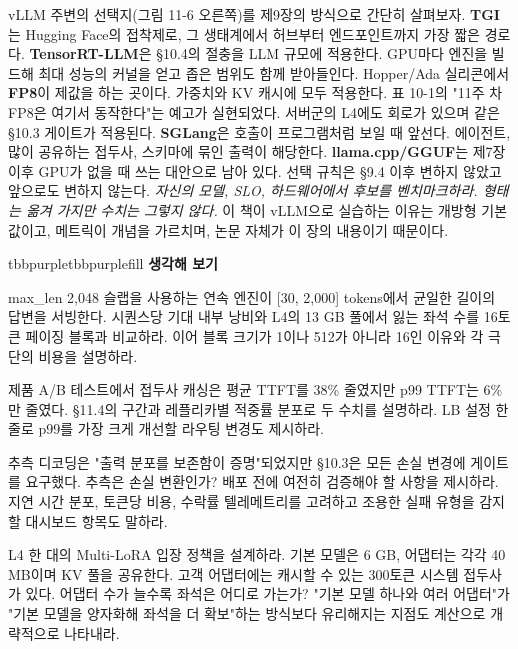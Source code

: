 vLLM 주변의 선택지(그림 11-6 오른쪽)를 제9장의 방식으로 간단히 살펴보자. \textbf{TGI}는 Hugging Face의 접착제로, 그 생태계에서 허브부터 엔드포인트까지 가장 짧은 경로다. \textbf{TensorRT-LLM}은 §10.4의 절충을 LLM 규모에 적용한다. GPU마다 엔진을 빌드해 최대 성능의 커널을 얻고 좁은 범위도 함께 받아들인다. Hopper/Ada 실리콘에서 \textbf{FP8}이 제값을 하는 곳이다. 가중치와 KV 캐시에 모두 적용한다. 표 10-1의 "11주 차 FP8은 여기서 동작한다"는 예고가 실현되었다. 서버군의 L4에도 회로가 있으며 같은 §10.3 게이트가 적용된다. \textbf{SGLang}은 호출이 프로그램처럼 보일 때 앞선다. 에이전트, 많이 공유하는 접두사, 스키마에 묶인 출력이 해당한다. \textbf{llama.cpp/GGUF}는 제7장 이후 GPU가 없을 때 쓰는 대안으로 남아 있다. 선택 규칙은 §9.4 이후 변하지 않았고 앞으로도 변하지 않는다. \textit{자신의 모델, SLO, 하드웨어에서 후보를 벤치마크하라. 형태는 옮겨 가지만 수치는 그렇지 않다.} 이 책이 vLLM으로 실습하는 이유는 개방형 기본값이고, 메트릭이 개념을 가르치며, 논문 자체가 이 장의 내용이기 때문이다.

\begin{calloutbox}{tbbpurple}{tbbpurplefill}
{\normalsize\bfseries\color{tbbpurple}생각해 보기}\par\vspace{3pt}
\begin{tbbitemize}
  \item max\_len 2,048 슬랩을 사용하는 연속 엔진이 [30, 2,000] tokens에서 균일한 길이의 답변을 서빙한다. 시퀀스당 기대 내부 낭비와 L4의 13 GB 풀에서 잃는 좌석 수를 16토큰 페이징 블록과 비교하라. 이어 블록 크기가 1이나 512가 아니라 16인 이유와 각 극단의 비용을 설명하라.
  \item 제품 A/B 테스트에서 접두사 캐싱은 평균 TTFT를 38\% 줄였지만 p99 TTFT는 6\%만 줄였다. §11.4의 구간과 레플리카별 적중률 분포로 두 수치를 설명하라. LB 설정 한 줄로 p99를 가장 크게 개선할 라우팅 변경도 제시하라.
  \item 추측 디코딩은 "출력 분포를 보존함이 증명"되었지만 §10.3은 모든 손실 변경에 게이트를 요구했다. 추측은 손실 변환인가? 배포 전에 여전히 검증해야 할 사항을 제시하라. 지연 시간 분포, 토큰당 비용, 수락률 텔레메트리를 고려하고 조용한 실패 유형을 감지할 대시보드 항목도 말하라.
  \item L4 한 대의 Multi-LoRA 입장 정책을 설계하라. 기본 모델은 6 GB, 어댑터는 각각 40 MB이며 KV 풀을 공유한다. 고객 어댑터에는 캐시할 수 있는 300토큰 시스템 접두사가 있다. 어댑터 수가 늘수록 좌석은 어디로 가는가? "기본 모델 하나와 여러 어댑터"가 "기본 모델을 양자화해 좌석을 더 확보"하는 방식보다 유리해지는 지점도 계산으로 개략적으로 나타내라.
\end{tbbitemize}
\end{calloutbox}

